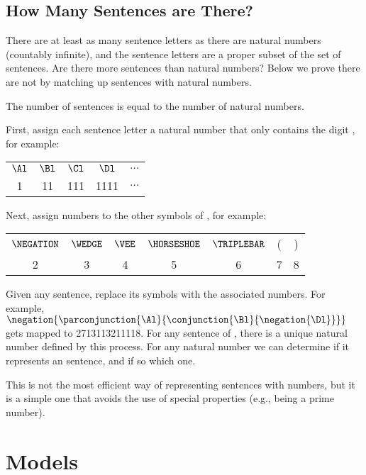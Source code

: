 \subsection{How Many \GSL{} Sentences are There?}
There are at least as many sentence letters as there are natural numbers (countably infinite), and the sentence letters are a proper subset of the set of sentences. 
Are there more sentences than natural numbers?  
Below we prove there are not by matching up sentences with natural numbers.
\begin{THEOREM}{}
The number of \GSL{} sentences is equal to the number of natural numbers.
\end{THEOREM}
\begin{PROOF}
First, assign each sentence letter a natural number that only contains the digit , for example:
\begin{center}
\begin{tabular}{ c c c c c }
$\Al$ & $\Bl$ & $\Cl$ & $\Dl$ & $\ldots$ \\
1 & 11 & 111 & 1111 & $\ldots$ \\
\end{tabular}
\end{center}
Next, assign numbers to the other symbols of \GSL{}, for example:
\begin{center}
\begin{tabular}{ c c c c c c c }
$\NEGATION$ & $\WEDGE$ & $\VEE$ & $\HORSESHOE$ & $\TRIPLEBAR$ & ( & ) \\
2 & 3 & 4 & 5 & 6 & 7 & 8 \\
\end{tabular}
\end{center}
Given any sentence, replace its symbols with the associated numbers.
For example, \mbox{$\negation{\parconjunction{\Al}{\conjunction{\Bl}{\negation{\Dl}}}}$} gets mapped to 2713113211118.
For any sentence of \GSL{}, there is a unique natural number defined by this process. 
For any natural number we can determine if it represents an \GSL{} sentence, and if so which one.
\end{PROOF}

\noindent{}This is not the most efficient way of representing sentences with numbers, but it is a simple one that avoids the use of special properties (e.g., being a prime number).


\section{Models}\label{Interpretations}

